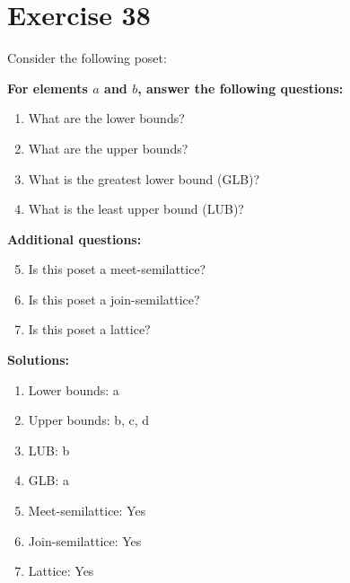 \documentclass{article}
\begin{document}
\section*{Exercise 38}
Consider the following poset:
\begin{center}
\end{center}

    \textbf{For elements $a$ and $b$, answer the following questions:}
\begin{enumerate}
    \item What are the lower bounds?
    \item What are the upper bounds?
    \item What is the greatest lower bound (GLB)?
    \item What is the least upper bound (LUB)?
\end{enumerate}
    \hspace*{3ex} \textbf{Additional questions:}
\begin{enumerate}
    \setcounter{enumi}{4}
    \item Is this poset a meet-semilattice?
    \item Is this poset a join-semilattice?
    \item Is this poset a lattice?
\end{enumerate}

\textbf{Solutions:}
\begin{enumerate}
    \item Lower bounds: {a}
    \item Upper bounds: {b, c, d}
    \item LUB: b
    \item GLB: a
    \item Meet-semilattice: Yes
    \item Join-semilattice: Yes
    \item Lattice: Yes
\end{enumerate}
\newpage
\end{document}
